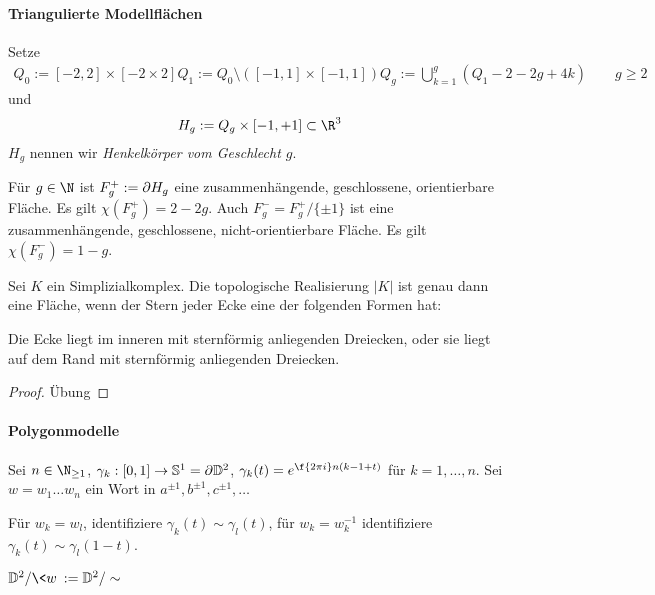 

\paragraph{Triangulierte Modellflächen}

Setze
\begin{align*}
	Q_0 := [-2, 2] \times [-2 \times 2]
	Q_1 := Q_0 \setminus ([-1,1] \times [-1,1])
	Q_g := \bigcup_{k=1}^g (Q_1 - 2 - 2g + 4k) \qquad g \ge 2
\end{align*}
und
\[
	H_g := Q_g \times [-1,+1] \subset \R^3
\]
$H_g$ nennen wir \emph{Henkelkörper vom Geschlecht $g$}.

\begin{st}
	Für $g \in \N$ ist $F_g^+ := \partial H_g$ eine zusammenhängende, geschlossene, orientierbare Fläche.
	Es gilt $\chi(F_g^+) = 2 - 2g$.
	Auch $F_g^- = F_g^+ / \{\pm 1\}$ ist eine zusammenhängende, geschlossene, nicht-orientierbare Fläche.
	Es gilt $\chi(F_g^-) = 1 - g$.
\end{st}

\begin{st}
	Sei $K$ ein Simplizialkomplex.
	Die topologische Realisierung $|K|$ ist genau dann eine Fläche, wenn der Stern jeder Ecke eine der folgenden Formen hat:

	Die Ecke liegt im inneren mit sternförmig anliegenden Dreiecken, oder sie liegt auf dem Rand mit sternförmig anliegenden Dreiecken.
	\begin{proof}
		Übung
	\end{proof}
\end{st}

\paragraph{Polygonmodelle}

Sei $n \in \N_{\ge 1}$, $\gamma_k: [0,1] \to \mathbb{S}^1 = \partial \mathbb{D}^2$, $\gamma_k(t) = e^{\f {2\pi i}n (k-1 + t)}$ für $k = 1, \dotsc, n$.
Sei $w = w_1 \dotsc w_n$ ein Wort  in $a^{\pm 1}, b^{\pm 1}, c^{\pm 1}, \dotsc$

Für $w_k = w_l$, identifiziere $\gamma_k(t) \sim \gamma_l(t)$, für $w_k = w_k^{-1}$ identifiziere $\gamma_k(t) \sim \gamma_l(1-t)$.

\begin{df}
	$\D^2 / \<w\> := \D^2 / \sim$
\end{df}

